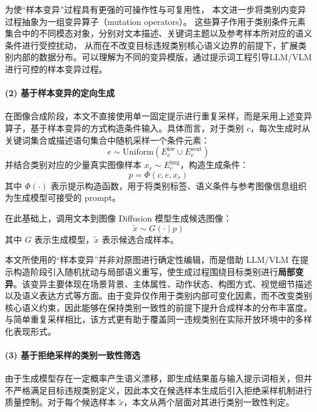 为使“样本变异”过程具有更强的可操作性与可复用性，
本文进一步将类别内变异过程抽象为一组变异算子（mutation operators）。
这些算子作用于类别条件元素集合中的不同模态对象，分别对文本描述、关键词主题以及参考样本所对应的语义条件进行受控扰动，
从而在不改变目标违规类别核心语义边界的前提下，扩展类别内部的数据分布。可以理解为不同的变异模版，通过提示词工程引导LLM/VLM进行可控的样本变异过程。

\paragraph{(2) 基于样本变异的定向生成}

在图像合成阶段，本文不直接使用单一固定提示进行重复采样，而是采用上述变异算子，基于样本变异的方式构造条件输入。具体而言，对于类别 $c$，每次生成时从关键词集合或描述语句集合中随机采样一个条件元素：
\begin{equation}
e \sim \mathrm{Uniform}(E_c^{\mathrm{kw}} \cup E_c^{\mathrm{sent}})
\end{equation}
并结合类别对应的少量真实图像样本 $x_r \sim E_c^{\mathrm{img}}$，构造生成条件：
\begin{equation}
p = \Phi(c, e, x_r)
\end{equation}
其中 $\Phi(\cdot)$ 表示提示构造函数，用于将类别标签、语义条件与参考图像信息组织为生成模型可接受的 prompt。

在此基础上，调用文本到图像 Diffusion 模型生成候选图像：
\begin{equation}
\tilde{x} \sim G(\cdot \mid p)
\end{equation}
其中 $G$ 表示生成模型，$\tilde{x}$ 表示候选合成样本。

本文所使用的“样本变异”并非对原图进行确定性编辑，而是借助 LLM/VLM 在提示构造阶段引入随机扰动与局部语义重写，使生成过程围绕目标类别进行\textbf{局部变异}。该变异主要体现在场景背景、主体属性、动作状态、构图方式、视觉细节描述以及语义表达方式等方面。由于变异仅作用于类别内部可变化因素，而不改变类别核心语义约束，因此能够在保持类别一致性的前提下提升合成样本的分布丰富度。与简单重复采样相比，该方式更有助于覆盖同一违规类别在实际开放环境中的多样化表现形式。

\paragraph{(3) 基于拒绝采样的类别一致性筛选}

由于生成模型存在一定概率产生语义漂移，即生成结果虽与输入提示词相关，但并不严格满足目标违规类别定义，因此本文在候选样本生成后引入拒绝采样机制进行质量控制。对于每个候选样本 $\tilde{x}$，本文从两个层面对其进行类别一致性判定。

